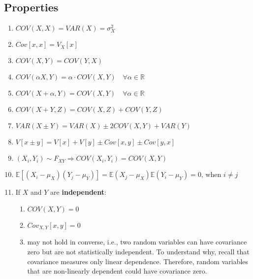 \subsection*{Properties}
\begin{enumerate}[itemsep=0.2cm]
    \item $COV(X, X) = VAR(X) = \sigma_X^2$ 
    \hfill \cite{ism-1}

    \item $Cov[x, x] = V_X[x]$ 
    \hfill \cite{mfml-1}

    \item $COV(X, Y) = COV(Y, X)$ 
    \hfill \cite{ism-1}

    \item $
        COV(\alpha X, Y) = \alpha \cdot COV(X, Y) 
        \quad \forall \alpha \in \mathbb{R}
    $ 
    \hfill \cite{ism-1}

    \item $
        COV(X + \alpha, Y) = COV(X, Y) 
        \quad \forall \alpha \in \mathbb{R}
    $ 
    \hfill \cite{ism-1}

    \item $COV(X + Y, Z) = COV(X, Z) + COV(Y, Z)$ 
    \hfill \cite{ism-1}

    \item $VAR(X \pm Y) = VAR(X) \pm 2COV(X, Y) + VAR(Y)$ 
    \hfill \cite{ism-1}

    \item $V[x \pm y] = V[x] + V[y] \pm Cov[x, y] \pm Cov[y, x]$ 
    \hfill \cite{mfml-1}

    \item $
        (X_i, Y_i) \sim F_{XY}
        \Rightarrow 
        COV(X_i, Y_i) = COV(X, Y)$ 
    \hfill \cite{ism-1}

    \item $
        \mathbb{E}[(X_i - \mu_X)(Y_j - \mu_Y)] 
        = \mathbb{E}(X_j - \mu_X)\mathbb{E}(Y_i - \mu_Y) 
        = 0  \text{, when } i \neq j
    $
    \hfill \cite{ism-1}

    \item If $X$ and $Y$ are \textbf{independent}:
    \begin{enumerate}
        \item $COV(X, Y) = 0$ \hfill \cite{ism-1}
        
        \item $Cov_{X,Y}[x, y] = 0$ \hfill \cite{mfml-1}

        \item may not hold in converse, i.e., two random variables can have covariance zero but are not statistically independent. To understand why, recall that covariance measures only linear dependence. Therefore, random variables that are non-linearly dependent could have covariance zero. \cite{mfml-1}
        

\end{enumerate}
\end{enumerate}
